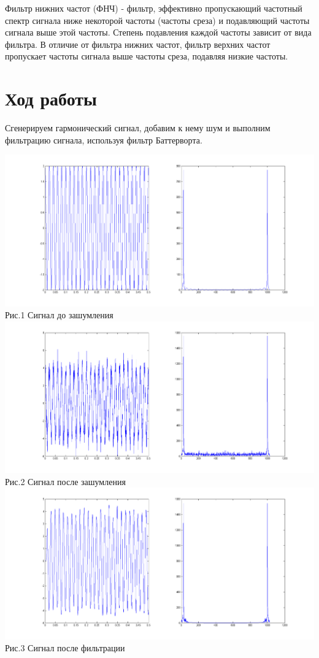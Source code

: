 \documentclass[a4paper]{article}
\begin{document}
Фильтр нижних частот (ФНЧ) - фильтр, эффективно пропускающий частотный спектр сигнала ниже некоторой частоты (частоты среза) и подавляющий частоты сигнала выше этой частоты. Степень подавления каждой частоты зависит от вида фильтра. В отличие от фильтра нижних частот, фильтр верхних частот пропускает частоты сигнала выше частоты среза, подавляя низкие частоты.


\section{Ход работы}
Сгенерируем гармонический сигнал, добавим к нему шум и выполним фильтрацию сигнала, используя фильтр Баттерворта.



\begin{center}
\includegraphics[scale = 0.4]{1.png}\\Рис.1 Сигнал до зашумления
\includegraphics[scale = 0.4]{2.png}\\Рис.2 Сигнал после зашумления
\includegraphics[scale = 0.4]{3.png}\\Рис.3 Сигнал после фильтрации
\end{center}
\end{document}
